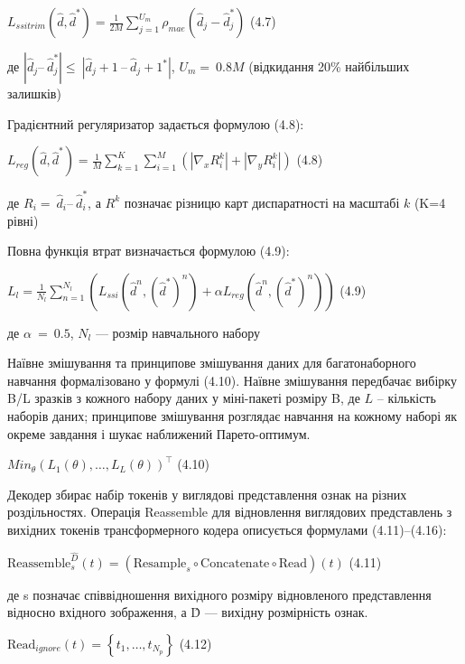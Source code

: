 \documentclass[
]{article}
\begin{document}
\(L_{ssitrim}\left( \widehat{d},{\widehat{d}}^{*} \right) = \frac{1}{2M}\sum_{j = 1}^{U_{m}}{\rho_{mae}\left( {\widehat{d}}_{j} - {\widehat{d}}_{j}^{*} \right)}\) (4.7)

де \(\left| {\widehat{d}}_{j}–\ {\widehat{d}}_{j}^{*} \right| \leq \ \left| {\widehat{d}}_{j} + 1\ –\ {\widehat{d}}_{j} + 1^{*} \right|\), \(U_{m} = \ 0.8M\) (відкидання 20\% найбільших залишків)

Градієнтний регуляризатор задається формулою (4.8):

\(L_{reg}\left( \widehat{d},{\widehat{d}}^{*} \right) = \frac{1}{M}\sum_{k = 1}^{K}{\sum_{i = 1}^{M}\left( {\left| \nabla_{x}R_{i}^{k} \right| + \left| \nabla_{y}R_{i}^{k} \right|} \right)}\) (4.8)

де \(R_{i} = \ {\widehat{d}}_{i}–\ {\widehat{d}}_{i}^{*}\), а \(R^{k}\) позначає різницю карт диспаратності на масштабі \(k\) (K=4 рівні)

Повна функція втрат визначається формулою (4.9):

\(L_{l} = \frac{1}{N_{l}}\sum_{n = 1}^{N_{l}}\left( {L_{ssi}({\widehat{d}}^{n},({\widehat{d}}^{*})^{n}) + \alpha L_{reg}({\widehat{d}}^{n},({\widehat{d}}^{*})^{n})} \right)\) (4.9)

де \(\alpha\  = \ 0.5\), \(N_{l}\) --- розмір навчального набору

Наївне змішування та принципове змішування даних для багатонаборного навчання формалізовано у формулі (4.10). Наївне змішування передбачає вибірку B/L зразків з кожного набору даних у міні-пакеті розміру B, де \(L\) -- кількість наборів даних; принципове змішування розглядає навчання на кожному наборі як окреме завдання і шукає наближений Парето-оптимум.

\({Min}_{\theta}\left( {L_{1}(\theta),\ldots,L_{L}(\theta)} \right)^{\top}\) (4.10)

Декодер збирає набір токенів у виглядові представлення ознак на різних роздільностях. Операція Reassemble для відновлення виглядових представлень з вихідних токенів трансформерного кодера описується формулами (4.11)--(4.16):

\(\text{Reassemble}_{s}^{\widehat{D}}(t) = \left( \text{Resample}_{s} \circ \text{Concatenate} \circ \text{Read} \right)(t)\) (4.11)

де s позначає співвідношення вихідного розміру відновленого представлення відносно вхідного зображення, а D̂ --- вихідну розмірність ознак.

\(\text{Read}_{ignore}(t) = \left\{ t_{1},\ldots,t_{N_{p}} \right\}\) (4.12)
\end{document}
